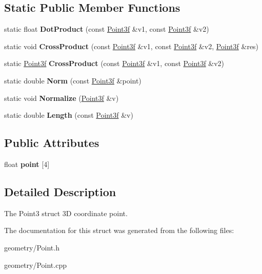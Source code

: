 \subsection*{Static Public Member Functions}
\begin{DoxyCompactItemize}
\item 
\mbox{\label{struct_point3f_ab6bc6585f4038a710d17f85daf8d9a9f}} 
static float {\bfseries Dot\+Product} (const \mbox{\hyperlink{struct_point3f}{Point3f}} \&v1, const \mbox{\hyperlink{struct_point3f}{Point3f}} \&v2)
\item 
\mbox{\label{struct_point3f_ab7a0686c13c8c8e8c793e86564c78071}} 
static void {\bfseries Cross\+Product} (const \mbox{\hyperlink{struct_point3f}{Point3f}} \&v1, const \mbox{\hyperlink{struct_point3f}{Point3f}} \&v2, \mbox{\hyperlink{struct_point3f}{Point3f}} \&res)
\item 
\mbox{\label{struct_point3f_a8200da0f3177c088c3d861529b4ee45b}} 
static \mbox{\hyperlink{struct_point3f}{Point3f}} {\bfseries Cross\+Product} (const \mbox{\hyperlink{struct_point3f}{Point3f}} \&v1, const \mbox{\hyperlink{struct_point3f}{Point3f}} \&v2)
\item 
\mbox{\label{struct_point3f_a37fa5b749602271aa69e7e8e005fa751}} 
static double {\bfseries Norm} (const \mbox{\hyperlink{struct_point3f}{Point3f}} \&point)
\item 
\mbox{\label{struct_point3f_ad61c0f7cc9951725b699f5e7a6051538}} 
static void {\bfseries Normalize} (\mbox{\hyperlink{struct_point3f}{Point3f}} \&v)
\item 
\mbox{\label{struct_point3f_aae9dbed1a41dd62e8bd420e62c3822ef}} 
static double {\bfseries Length} (const \mbox{\hyperlink{struct_point3f}{Point3f}} \&v)
\end{DoxyCompactItemize}
\subsection*{Public Attributes}
\begin{DoxyCompactItemize}
\item 
\mbox{\label{struct_point3f_a237b76269ac9e8eb01186641e65971f7}} 
float {\bfseries point} \mbox{[}4\mbox{]}
\end{DoxyCompactItemize}


\subsection{Detailed Description}
The Point3 struct 3D coordinate point. 

The documentation for this struct was generated from the following files\+:\begin{DoxyCompactItemize}
\item 
geometry/Point.\+h\item 
geometry/Point.\+cpp\end{DoxyCompactItemize}
